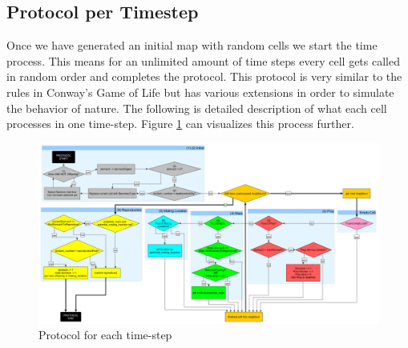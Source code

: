 \documentclass[11pt]{article}
\begin{document}
\subsection{Protocol per Timestep}
Once we have generated an initial map with random cells we start the time process. This means for an unlimited amount of time steps every cell gets called in random order and completes the protocol. This protocol is very similar to the rules in Conway's Game of Life but has various extensions in order to simulate the behavior of nature. The following is detailed description of what each cell processes in one time-step. Figure \ref{fig:protocol} can visualizes this process further.

\thispagestyle{empty}
\begin{figure}[p]
\centering
\vspace*{-2cm}
\includegraphics[angle=90,scale=0.34]{DayProtocol.png}
\caption{Protocol for each time-step}
\label{fig:protocol}
\end{figure}


\setcounter{protocolCounter}{1}
\end{document}
